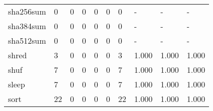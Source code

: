 \begin{longtable}{lp{1.3cm}p{1.3cm}p{1.3cm}p{1.3cm}p{1.3cm}p{1.3cm}p{1.3cm}p{1.3cm}p{1.3cm}}
sha256sum &                      0 &                                  0 &                                 0 &                                0 &                                 0 &                               0 &                                    - &                                      - &                                    - \\
sha384sum &                      0 &                                  0 &                                 0 &                                0 &                                 0 &                               0 &                                    - &                                      - &                                    - \\
sha512sum &                      0 &                                  0 &                                 0 &                                0 &                                 0 &                               0 &                                    - &                                      - &                                    - \\
shred     &                      3 &                                  0 &                                 0 &                                0 &                                 0 &                               3 &                                1.000 &                                  1.000 &                                1.000 \\
shuf      &                      7 &                                  0 &                                 0 &                                0 &                                 0 &                               7 &                                1.000 &                                  1.000 &                                1.000 \\
sleep     &                      7 &                                  0 &                                 0 &                                0 &                                 0 &                               7 &                                1.000 &                                  1.000 &                                1.000 \\
sort      &                     22 &                                  0 &                                 0 &                                0 &                                 0 &                              22 &                                1.000 &                                  1.000 &                                1.000 \\

\end{longtable}
